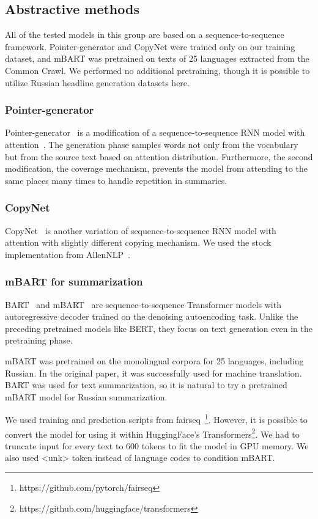 \documentclass[runningheads]{llncs}
\begin{document}
\subsection{Abstractive methods}
All of the tested models in this group are based on a sequence-to-sequence framework. Pointer-generator and CopyNet were trained only on our training dataset, and mBART was pretrained on texts of 25 languages extracted from the Common Crawl. We performed no additional pretraining, though it is possible to utilize Russian headline generation datasets here.

\subsubsection{Pointer-generator}
Pointer-generator~\cite{pg} is a modification of a sequence-to-sequence RNN model with attention~\cite{rnn_attention}. The generation phase samples words not only from the vocabulary but from the source text based on attention distribution. Furthermore, the second modification, the coverage mechanism, prevents the model from attending to the same places many times to handle repetition in summaries.

\subsubsection{CopyNet}
CopyNet~\cite{copynet} is another variation of sequence-to-sequence RNN model with attention with slightly different copying mechanism. We used the stock implementation from AllenNLP~\cite{allennlp}.

\subsubsection{mBART for summarization}
BART~\cite{bart} and mBART~\cite{mbart} are sequence-to-sequence Transformer models with autoregressive decoder trained on the denoising autoencoding task. Unlike the preceding pretrained models like BERT, they focus on text generation even in the pretraining phase.

mBART was pretrained on the monolingual corpora for 25 languages, including Russian. In the original paper, it was successfully used for machine translation. BART was used for text summarization, so it is natural to try a pretrained mBART model for Russian summarization.

We used training and prediction scripts from fairseq~\cite{fairseq}\footnote{https://github.com/pytorch/fairseq}. However, it is possible to convert the model for using it within HuggingFace's Transformers\footnote{https://github.com/huggingface/transformers}. We had to truncate input for every text to 600 tokens to fit the model in GPU memory. We also used <unk> token instead of language codes to condition mBART.
\end{document}
